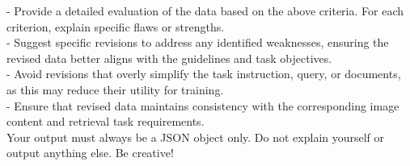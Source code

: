 \begin{figure*}[t]
\begin{prompt}[title={Prompt: Synthesizing Retrieval Data (Only Query Image)}, label=prompt:ret_one_image]
- Provide a detailed evaluation of the data based on the above criteria. For each criterion, explain specific flaws or strengths.\\
- Suggest specific revisions to address any identified weaknesses, ensuring the revised data better aligns with the guidelines and task objectives.\\
- Avoid revisions that overly simplify the task instruction, query, or documents, as this may reduce their utility for training.\\
- Ensure that revised data maintains consistency with the corresponding image content and retrieval task requirements.\\

Your output must always be a JSON object only. Do not explain yourself or output anything else. Be creative!
    
\end{prompt}
\end{figure*}


